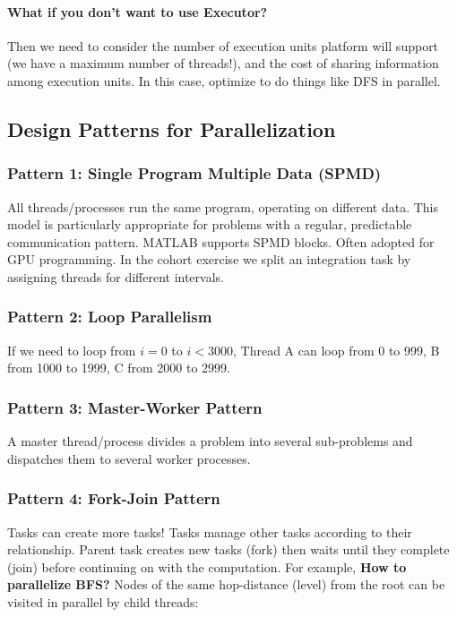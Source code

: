 \documentclass{article}
\begin{document}
\paragraph{What if you don't want to use Executor?} Then we need to consider the number of execution units platform will support (we have a maximum number of threads!), and the cost of sharing information among execution units. In this case, optimize to do things like DFS in parallel.


\subsection{Design Patterns for Parallelization}

\subsubsection{Pattern 1: Single Program Multiple Data (SPMD)}
All threads/processes run the same program, operating on different data. This model is particularly appropriate for problems with a regular, predictable communication pattern. MATLAB supports SPMD blocks. Often adopted for GPU programming. In the cohort exercise we split an integration task by assigning threads for different intervals.

\subsubsection{Pattern 2: Loop Parallelism}
If we need to loop from $i = 0$ to $i < 3000$, Thread A can loop from 0 to 999, B from 1000 to 1999, C from 2000 to 2999.

\subsubsection{Pattern 3: Master-Worker Pattern}
A master thread/process divides a problem into several sub-problems and dispatches them to several worker processes.

\subsubsection{Pattern 4: Fork-Join Pattern}
Tasks can create more tasks! Tasks manage other tasks according to their relationship. Parent task creates new tasks (fork) then waits until they complete (join) before continuing on with the computation. For example, \textbf{How to parallelize BFS?} Nodes of the same hop-distance (level) from the root can be visited in parallel by child threads:
\end{document}
